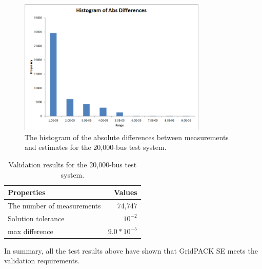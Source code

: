\documentclass[a4paper]{article}
\begin{document}
\begin{figure}[h]
\centering
\includegraphics[width=0.8\textwidth]{20000.png}
\caption{\label{fig:hist20K}The histogram of the absolute differences between
measurements and estimates for the 20,000-bus test system.}
\label{fig:20000}
\end{figure}

\begin{table} [h]
\centering
\begin{tabular}{l|r}
Properties & Values \\\hline
The number of measurements & 74,747 \\
Solution tolerance	& $10^{-2}$ \\
max difference	&  $9.0*10^{-5}$ 
\end{tabular}
\caption{\label{tab:20000} Validation results for  the 20,000-bus test system.}
\end{table}



In summary, all the test results above have shown that GridPACK SE meets the validation requirements.
\end{document}

